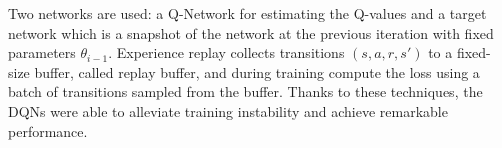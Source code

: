 Two networks are used: a Q-Network for estimating the Q-values and
a target network which is a snapshot of the network at the previous iteration with fixed parameters $\theta_{i- 1}$.
%
Experience replay collects transitions $(s, a, r, s')$ to a fixed-size buffer, called replay buffer, and during training 
compute the loss using a batch of transitions sampled from the buffer.
%
Thanks to these techniques, the DQNs were able to alleviate training instability and achieve remarkable performance.

